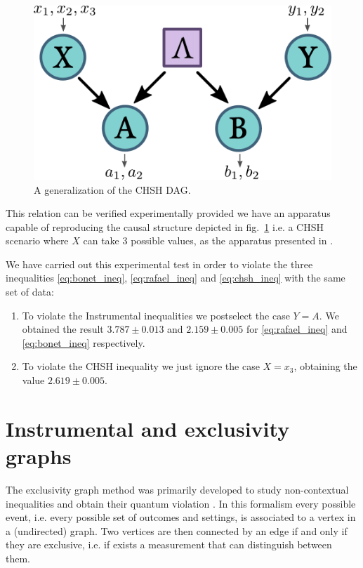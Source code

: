 \documentclass[floatfix, twocolumn, aps, prl]{revtex4-1}
\begin{document}
\begin{figure}[h]
    \centering
    \includegraphics[width=.7\columnwidth]{images/genchshdag.pdf}
    \caption{A generalization of the CHSH DAG.}
    \label{fig:genchshdag}
\end{figure}
This relation can be verified experimentally provided we have an apparatus capable of
reproducing the causal structure depicted in fig.~\ref{fig:genchshdag} i.e. a CHSH scenario
where $X$ can take 3 possible values, as the apparatus presented in
\cite{chaves2018}.

We have carried out this experimental test in order to violate the three inequalities
\eqref{eq:bonet_ineq}, \eqref{eq:rafael_ineq} and \eqref{eq:chsh_ineq} with the same set of
data:
\begin{enumerate}
    \item To violate the Instrumental inequalities we postselect the case
        $Y = A$. We obtained the result $3.787 \pm 0.013$ and $2.159 \pm 0.005$ for \eqref{eq:rafael_ineq} and
        \eqref{eq:bonet_ineq} respectively.
        
    \item To violate the CHSH inequality we just ignore the case $X = x_3$,
        obtaining the value $2.619 \pm 0.005$.
\end{enumerate}

\section*{Instrumental and exclusivity graphs}

The exclusivity graph method was primarily developed to study
non-contextual inequalities and obtain their quantum violation
\cite{cabello2014}. 
In this formalism every possible event, i.e. every possible set of outcomes and
settings, is associated to a vertex in a (undirected) graph.
Two vertices are then connected by an edge if and only if they are exclusive,
i.e. if exists a measurement that can distinguish between them. 
\end{document}
